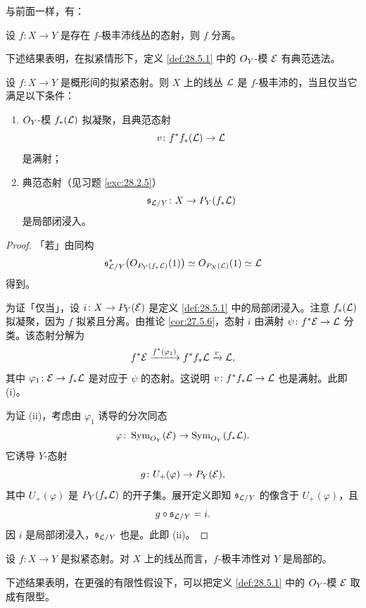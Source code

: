 与前面一样，有：

\begin{lemma}\label{lem:28.5.3}
设 $f\colon X\to Y$ 是存在 $f$-极丰沛线丛的态射，则 $f$ 分离。
\end{lemma}

下述结果表明，在拟紧情形下，定义 \ref{def:28.5.1} 中的 $O_Y$-模 $\mathcal{E}$ 有典范选法。

\begin{lemma}\label{lem:28.5.4}
设 $f\colon X\to Y$ 是概形间的拟紧态射。则 $X$ 上的线丛 $\mathcal{L}$ 是 $f$-极丰沛的，当且仅当它满足以下条件：
\begin{enumerate}[label=(\roman*),leftmargin=2.6em,itemsep=0.3ex]
  \item $O_Y$-模 $f_*(\mathcal{L})$ 拟凝聚，且典范态射
  \[
  v\colon f^*f_*(\mathcal{L})\to\mathcal{L}
  \]
  是满射；
  \item 典范态射（见习题 \ref{exc:28.2.5}）
  \[
  \mathfrak s_{\mathcal{L}/Y}\colon X\to P_Y(f_*\mathcal{L})
  \]
  是局部闭浸入。
\end{enumerate}
\end{lemma}

\begin{proof}
「若」由同构
\[
\mathfrak s_{\mathcal{L}/Y}^*\bigl(O_{P_Y(f_*\mathcal{L})}(1)\bigr)\simeq O_{P_X(\mathcal{L})}(1)\simeq\mathcal{L}
\]
得到。

为证「仅当」，设 $i\colon X\to P_Y(\mathcal{E})$ 是定义 \ref{def:28.5.1} 中的局部闭浸入。注意 $f_*(\mathcal{L})$ 拟凝聚，因为 $f$ 拟紧且分离。由推论 \ref{cor:27.5.6}，态射 $i$ 由满射 $\psi\colon f^*\mathcal{E}\to\mathcal{L}$ 分类。该态射分解为
\[
f^*\mathcal{E}\xrightarrow{f^*(\varphi_1)}f^*f_*\mathcal{L}\xrightarrow{v}\mathcal{L},
\]
其中 $\varphi_1\colon\mathcal{E}\to f_*\mathcal{L}$ 是对应于 $\psi$ 的态射。这说明 $v\colon f^*f_*\mathcal{L}\to\mathcal{L}$ 也是满射。此即 (i)。

为证 (ii)，考虑由 $\varphi_1$ 诱导的分次同态
\[
\varphi\colon\operatorname{Sym}_{O_Y}(\mathcal{E})\to\operatorname{Sym}_{O_Y}(f_*\mathcal{L}).
\]
它诱导 $Y$-态射
\[
g\colon U_+(\varphi)\to P_Y(\mathcal{E}),
\]
其中 $U_+(\varphi)$ 是 $P_Y(f_*\mathcal{L})$ 的开子集。展开定义即知 $\mathfrak s_{\mathcal{L}/Y}$ 的像含于 $U_+(\varphi)$，且
\[
g\circ\mathfrak s_{\mathcal{L}/Y}=i.
\]
因 $i$ 是局部闭浸入，$\mathfrak s_{\mathcal{L}/Y}$ 也是。此即 (ii)。
\end{proof}

\begin{corollary}\label{cor:28.5.5}
设 $f\colon X\to Y$ 是拟紧态射。对 $X$ 上的线丛而言，$f$-极丰沛性对 $Y$ 是局部的。
\end{corollary}

下述结果表明，在更强的有限性假设下，可以把定义 \ref{def:28.5.1} 中的 $O_Y$-模 $\mathcal{E}$ 取成有限型。

